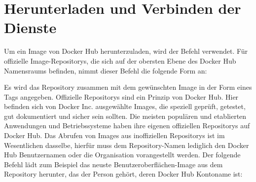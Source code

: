 \section{Herunterladen und Verbinden der Dienste}
Um ein Image von Docker Hub herunterzuladen, wird
der  Befehl verwendet.
Für offizielle Image-Repositorys, die sich
auf der obersten Ebene des Docker Hub Namensraums befinden,
nimmt dieser Befehl die folgende Form an:
Es wird das Repository zusammen mit dem gewünschten Image
in der Form eines Tags angegeben.
Offizielle Repositorys sind ein Prinzip von Docker Hub.
Hier befinden sich von Docker Inc. ausgewählte
Images, die speziell geprüft, getestet,
gut dokumentiert und sicher sein sollten.
Die meisten populären und etablierten Anwendungen
und Betriebssysteme haben ihre eigenen
offiziellen Repositorys auf Docker Hub.
Das Abrufen von Images aus inoffiziellen Repositorys
ist im Wesentlichen dasselbe, hierfür
muss dem Repository-Namen
lediglich den Docker Hub Benutzernamen oder die Organisation
vorangestellt werden.
Der folgende Befehl lädt zum Beispiel das neuste
Benutzeroberflächen-Image aus dem 
Repository herunter, das der Person gehört, deren Docker Hub Kontoname
 ist:
